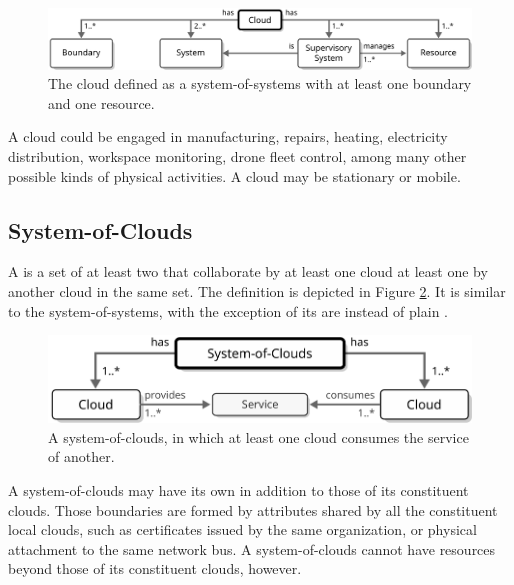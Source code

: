 \begin{figure}[ht!]
  \centering
  \includegraphics[scale=0.9]{figures/cloud}
  \caption{
    The cloud defined as a system-of-systems with at least one boundary and one resource.
  }
  \label{fig:cloud}
\end{figure}

A cloud could be engaged in manufacturing, repairs, heating, electricity distribution, workspace monitoring, drone fleet control, among many other possible kinds of physical activities.
A cloud may be stationary or mobile.

\subsection{System-of-Clouds}
\label{sec:concepts:soc}

A  is a set of at least two  that collaborate by at least one cloud  at least one   by another cloud in the same set.
The definition is depicted in Figure \ref{fig:system-of-clouds}.
It is similar to the system-of-systems, with the exception of its  are  instead of plain .

\begin{figure}[ht!]
  \centering
  \includegraphics[scale=0.9]{figures/system-of-clouds}
  \caption{
    A system-of-clouds, in which at least one cloud consumes the service of another.
  }
  \label{fig:system-of-clouds}
\end{figure}

A system-of-clouds may have its own  in addition to those of its constituent clouds.
Those boundaries are formed by attributes shared by all the constituent local clouds, such as certificates issued by the same organization, or physical attachment to the same network bus.
A system-of-clouds cannot have resources beyond those of its constituent clouds, however.

